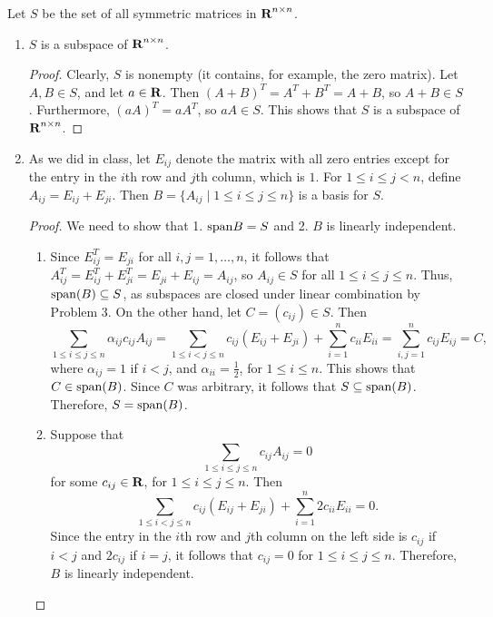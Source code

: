 \documentclass{homework}
\begin{document}
	\question Let $S$ be the set of all symmetric matrices in $\textnormal{\bf R}^{n\times n}$.
	\begin{enumerate}
		\item $S$ is a subspace of $\textnormal{\bf R}^{n\times n}$.
		\begin{proof}
			Clearly, $S$ is nonempty (it contains, for example, the zero matrix). Let $A, B \in S$, and let $a \in \textnormal{\bf R}$. Then
			$(A+B)^T = A^T + B^T = A + B$, so $A+B \in S$. Furthermore, $(aA)^T = aA^T$, so $aA \in S$. This shows that $S$ is a subspace of $\textnormal{\bf R}^{n\times n}$.
		\end{proof}
		
		\item As we did in class, let $E_{ij}$ denote the matrix with all zero entries except for the entry in the $i$th row and $j$th column, which is $1$. For $1 \le i \le j < n$, define $A_{ij} = E_{ij} + E_{ji}$. Then $B = \{A_{ij} \mid 1 \le i \le j \le n\}$ is a basis for $S$.
		\begin{proof}
			We need to show that 1. $\mathrm{span}{B} = S$ and 2. $B$ is linearly independent.
			\begin{enumerate}
				\item Since $E_{ij}^T = E_{ji}$ for all $i,j =1,\dots, n$, it follows that $A_{ij}^T = E_{ij}^T + E_{ji}^T = E_{ji} + E_{ij} = A_{ij}$, so $A_{ij}\in S$ for all $1\le i \le j\le n$. Thus, $\mathrm{span}(B)\subseteq S$, as subspaces are closed under linear combination by Problem 3. On the other hand, let $C = (c_{ij}) \in S$. Then
				\begin{equation*}
					\sum_{1\le i\le j \le n} \alpha_{ij}c_{ij}A_{ij} = \sum_{1\le i < j \le n}c_{ij}(E_{ij} + E_{ji}) + \sum_{i=1}^n c_{ii}E_{ii} = \sum_{i,j=1}^n c_{ij}E_{ij} = C,
				\end{equation*}
				where $\alpha_{ij} = 1$ if $i < j$, and $\alpha_{ii} = \frac{1}{2}$, for $1 \le i \le n$. This shows that $C \in \mathrm{span}(B)$. Since $C$ was arbitrary, it follows that $S \subseteq \mathrm{span}(B)$. Therefore, $S = \mathrm{span}(B)$.
				
				\item Suppose that
				\begin{equation*}
					\sum_{1\le i\le j\le n}c_{ij}A_{ij} = 0
				\end{equation*}
				for some $c_{ij} \in \textnormal{\bf R}$, for $1 \le i \le j \le n$. Then
				\begin{equation*}
					\sum_{1\le i < j \le n}c_{ij}(E_{ij} + E_{ji}) + \sum_{i=1}^n 2c_{ii}E_{ii} = 0.
				\end{equation*}
				Since the entry in the $i$th row and $j$th column on the left side is $c_{ij}$ if $i< j$ and $2c_{ij}$ if $i = j$, it follows that $c_{ij} = 0$ for $1\le i\le j \le n$. Therefore, $B$ is linearly independent.
			\end{enumerate}
		\end{proof}
	\end{enumerate}
	
\end{document}
